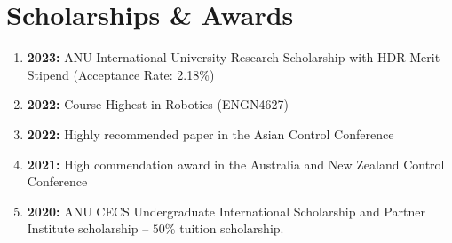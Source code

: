 \section{Scholarships \& Awards}
\begin{enumerate}\itemsep0em
    \item \textbf{2023:} ANU International University Research Scholarship with HDR Merit Stipend (Acceptance Rate: 2.18\%)
    \item \textbf{2022:} Course Highest in Robotics (ENGN4627)
    \item \textbf{2022:} Highly recommended paper in the Asian Control Conference
    \item \textbf{2021:} High commendation award in the Australia and New Zealand Control Conference
    \item \textbf{2020:} ANU CECS Undergraduate International Scholarship and Partner Institute scholarship -- $50\%$ tuition scholarship.
\end{enumerate}